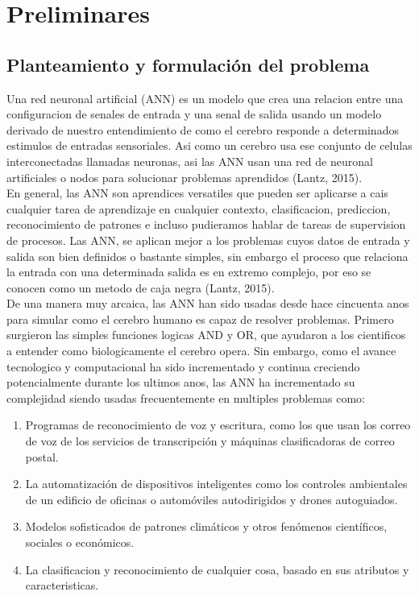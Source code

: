 \chapter{Preliminares}

\section{Planteamiento y formulaci\'on del problema}

Una red neuronal artificial (ANN) es un modelo que crea una relacion entre una configuracion de senales de entrada y una senal de salida usando un modelo derivado de nuestro entendimiento de como el cerebro responde a determinados estimulos de entradas sensoriales. Asi como un cerebro usa ese conjunto de celulas interconectadas llamadas neuronas, asi las ANN usan una red de neuronal artificiales o nodos para solucionar problemas aprendidos (Lantz, 2015).\\

En general, las ANN son aprendices versatiles que pueden ser aplicarse a cais cualquier tarea de aprendizaje en cualquier contexto, clasificacion, prediccion, reconocimiento de patrones e incluso pudieramos hablar de tareas de supervision de procesos. Las ANN, se aplican mejor a los problemas cuyos datos de entrada y salida son bien definidos o bastante simples, sin embargo el proceso que relaciona la entrada con una determinada salida es en extremo complejo, por eso se conocen como un metodo de caja negra (Lantz, 2015).\\

De una manera muy arcaica, las ANN han sido usadas desde hace cincuenta anos para simular como el cerebro humano es capaz de resolver problemas. Primero surgieron las simples funciones logicas AND y OR, que ayudaron a los cientificos a entender como biologicamente el cerebro opera. Sin embargo, como el avance tecnologico y computacional ha sido incrementado y continua creciendo potencialmente durante los ultimos anos, las ANN ha incrementado su complejidad siendo usadas frecuentemente en multiples problemas como:

\begin{enumerate}
    \item{Programas de reconocimiento de voz y escritura, como los que usan los correo de voz
de los servicios de transcripción y máquinas clasificadoras de correo postal.}
	\item{La automatización de dispositivos inteligentes como los controles ambientales de un edificio de oficinas o automóviles autodirigidos y drones autoguiados.}
	\item{Modelos sofisticados de patrones climáticos y otros fenómenos científicos, sociales o económicos.}
	\item{La clasificacion y reconocimiento de cualquier cosa, basado en sus atributos y caracteristicas.}
\end{enumerate} 

